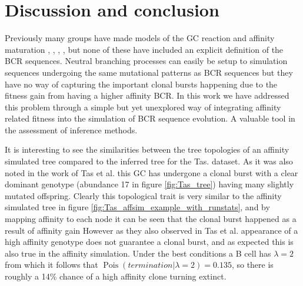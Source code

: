 \section{Discussion and conclusion}
Previously many groups have made models of the GC reaction and affinity maturation \cite{Reshetova_2017}, \cite{Shahaf_2008}, \cite{Chaudhury_2014}, \cite{Wang_Mata_2015}, but none of these have included an explicit definition of the BCR sequences.
Neutral branching processes can easily be setup to simulation sequences undergoing the same mutational patterns as BCR sequences but they have no way of capturing the important clonal bursts happening due to the fitness gain from having a higher affinity BCR.
In this work we have addressed this problem through a simple but yet unexplored way of integrating affinity related fitness into the simulation of BCR sequence evolution.
A valuable tool in the assessment of inference methods.

It is interesting to see the similarities between the tree topologies of an affinity simulated tree compared to the inferred tree for the Tas. dataset.
As it was also noted in the work of Tas et al. \cite{tas2016visualizing} this GC has undergone a clonal burst with a clear dominant genotype (abundance 17 in figure \ref{fig:Tas_tree}) having many slightly mutated offspring.
Clearly this topological trait is very similar to the affinity simulated tree in figure \ref{fig:Tas_affsim_example_with_runstats}, and by mapping affinity to each node it can be seen that the clonal burst happened as a result of affinity gain
However as they also observed in Tas et al. appearance of a high affinity genotype does not guarantee a clonal burst, and as expected this is also true in the affinity simulation.
Under the best conditions a B cell has $\lambda=2$ from which it follows that $\operatorname{Pois}(termination | \lambda=2) = 0.135$, so there is roughly a 14\% chance of a high affinity clone turning extinct.




